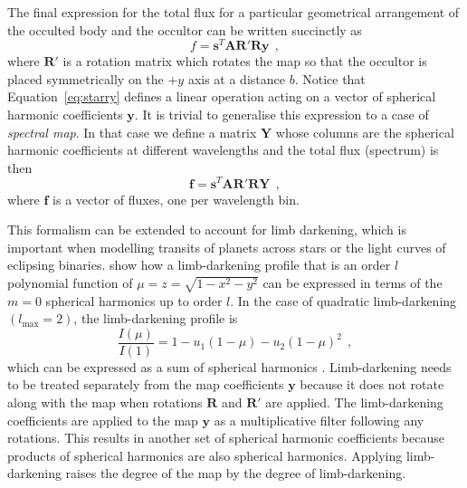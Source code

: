 \documentclass[12pt,dvipsnames]{report}
\renewcommand{\vec}[1]{\boldsymbol{\mathbf{#1}}}
\newcommand{\hquad}{~~}
\begin{document}
The final expression for the total flux for a particular geometrical
arrangement of the occulted body and the occultor can be written
succinctly as
\begin{equation}
    f = \mathbf{s}^T\mathbf{A}\mathbf{R}'\mathbf{R}\mathbf{y}
    \hquad,
    \label{eq:starry}
\end{equation}
where $\mathbf{R}'$ is a rotation matrix which rotates the map so that the occultor
is placed symmetrically on the $+y$ axis at a distance $b$.
Notice that Equation~\ref{eq:starry} defines a linear operation acting on a vector
of spherical harmonic coefficients $\mathbf{y}$.
It is trivial to generalise this expression to a case of \emph{spectral map}. In
that case we define a matrix $\vec Y$ whose columns are the spherical harmonic coefficients
at different wavelengths and the total flux (spectrum) is then
\begin{equation}
    \mathbf{f} = \mathbf{s}^T\mathbf{A}\mathbf{R}'\mathbf{R}\mathbf{Y}
    \hquad,
    \label{eq:starry_mw}
\end{equation}
where $\mathbf{f}$ is a vector of fluxes, one per wavelength bin.

This formalism can be extended to account for limb darkening, which is
important when modelling transits of planets across stars or the light curves of
eclipsing binaries. \citet{2020AJ....159..123A} show how a limb-darkening
profile that is an order $l$ polynomial function of
$\mu=z=\sqrt{1-x^{2}-y^{2}}$ can be expressed in terms of the $m=0$ spherical
harmonics up to order $l$. In the case of quadratic limb-darkening
$(l_\mathrm{max}=2)$, the limb-darkening profile is
\begin{equation}
    \frac{I(\mu)}{I(1)}=1-u_{1}(1-\mu)-u_{2}(1-\mu)^{2}
    \hquad,
\end{equation}
which can be expressed as a sum of spherical harmonics
\citep[Equation 38 in][]{2019AJ....157...64L}. Limb-darkening needs to be
treated separately from the map coefficients $\mathbf{y}$ because it does not rotate along with the map
when rotations $\mathbf{R}$ and $\mathbf{R}'$ are applied. The limb-darkening
coefficients are applied to the map $\mathbf{y}$ as a multiplicative filter
following any rotations. This results in another set of spherical harmonic
coefficients because products of spherical harmonics are also spherical
harmonics. Applying limb-darkening raises the degree of the map by the degree
of limb-darkening.
\end{document}
